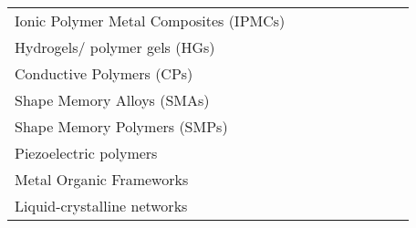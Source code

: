 \documentclass{article}
\begin{document}
\begin{landscape}
\begin{table}[htbp]
\begin{tabular}{|p{3.4cm}|p{1.5cm}|p{1.5cm}|p{1.5cm}|p{1.5cm}|p{1.5cm}|p{1.5cm}|p{1.5cm}|p{1.5cm}|}
			&  
			&  
			&  
			&  
			&  
			&    \\
			\hline
			\raggedright Ionic Polymer Metal Composites (IPMCs)
			& \cite{Johnson2008,Lughmani2009,Brunetto2009,Wang2021a,Brunetto2011}
			&  \cellcolor{myLightGray} \cite{NematNasser2001,Akle2011,Ulbricht2022,Porfiri2008,Shahinpoor2001,Shahinpoor2004,Kruusamaee2015,Jo2013}
			& \cite{Chang2018}
			&  
			&  
			&  
			&  
			& \cite{Brunetto2009,Wang2021a,Brunetto2011}  \\
			\hline
			Hydrogels/ polymer gels (HGs)
			&  \cellcolor{myLightGray} \cite{Ehrenhofer2016permeation,Xue2024,Kim2017,Ding2016} 
			&  \cellcolor{myLightGray} \cite{Leichsenring2017,Grimshaw1990,Attaran2015,Ballhause2008} %
			&  \cellcolor{myLightGray} \cite{Kuo2014,Zrinyi1997,Sivudu2009,Raikher2003,Tian2024}  %
			&  \cellcolor{myLightGray} \cite{Maehlich2023jimss,Li2019,Zari2024,Suzuki1990,Kim2010,Truong2018,Sumaru2006}
			&  \cellcolor{myLightGray} \cite{Leichsenring2017,EsserKahn2008,Li2005} 
			&  \cellcolor{myLightGray} \cite{Pu2024,Herrmann2021,Pedrosa2011,Nishat2022,Kim2013,Murakami2005,Erfkamp2019,Miyata2002,Nguyen2018,Gaziano2024} %
			&  \cellcolor{myLightGray} \cite{Yan2018,Kroh2018,Soppimath2001,Zhang2012,Krause2016,MacKenna2015,ManaviTehrani2010} %
			&  \cellcolor{myLightGray} \cite{Bellmann2015,Luo2023,Lv2018,Tellis2011} \\
			\hline
			Conductive Polymers (CPs)
			& 
			& \cellcolor{myLightGray} \cite{Otero1998,Otero2012,He2014,Baughman1996,Madden2002,Smela1993}
			& 
			&  
			&  
			&  
			&  
			&  \\
			\hline
			Shape Memory Alloys (SMAs)
			& \cellcolor{myLightGray} \cite{Wang2017,Sofla2008,Tadaki1988,Jani2014,Seelecke2004,Sun2012}
			& 
			& \cite{Faran2015}
			& \cite{Herath2020} %
			& 
			&  
			&  
			&  \\
			\hline
			Shape Memory Polymers (SMPs)
			& \cellcolor{myLightGray} \cite{Luo2024,Jang2021,Wang2022}
			& 
			& 
			&  
			&  
			&  
			&  
			& \cite{Venkatesan2019,Chen2009}  \\
			\hline
					\raggedright Piezoelectric polymers
			& \cellcolor{myLightGray}  \cite{Liu2007}
			& 
			& 
			& 
			& 
			&  
			&  
			& \\
			\hline
			\raggedright Metal Organic Frameworks
			& 
			& 
			& 
			& 
			& \cellcolor{myLightGray}  \cite{Krause2016a}
			&  
			&  
			& \cite{Li2024} \\
			\hline
			\raggedright Liquid-crystalline networks
			& \cite{Rousseau2003,Thomsen2001,Ware2015}

\end{tabular}
\end{table}
\end{landscape}
\end{document}
